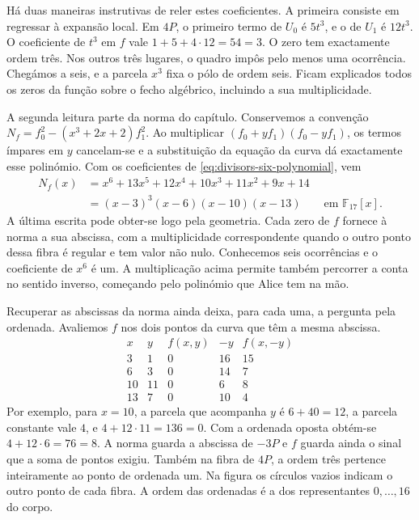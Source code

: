 Há duas maneiras instrutivas de reler estes coeficientes. A primeira
consiste em regressar à expansão local. Em \(4P\), o primeiro
termo de \(U_0\) é \(5t^3\), e o de \(U_1\) é \(12t^3\).
O coeficiente de \(t^3\) em \(f\) vale
\(1+5+4\cdot12=54=3\). O zero tem exactamente ordem três.
Nos outros três lugares, o quadro impôs pelo menos uma ocorrência.
Chegámos a seis, e a parcela \(x^3\) fixa o pólo de ordem seis.
Ficam explicados todos os zeros da função sobre o fecho algébrico,
incluindo a sua multiplicidade.

A segunda leitura parte da norma do capítulo. Conservemos a
convenção \(N_f=f_0^2-(x^3+2x+2)f_1^2\). Ao multiplicar
\((f_0+y f_1)(f_0-y f_1)\), os termos ímpares em \(y\)
cancelam-se e a substituição da equação da curva dá exactamente
esse polinómio. Com os coeficientes de \eqref{eq:divisors-six-polynomial},
vem
\begin{align*}
 N_f(x)
 &=x^6+13x^5+12x^4+10x^3+11x^2+9x+14\\
 &=(x-3)^3(x-6)(x-10)(x-13)
              \qquad\text{em }\mathbb F_{17}[x].
\end{align*}
A última escrita pode obter-se logo pela geometria. Cada zero de
\(f\) fornece à norma a sua abscissa, com a multiplicidade
correspondente quando o outro ponto dessa fibra é regular e tem
valor não nulo. Conhecemos seis ocorrências e o coeficiente de
\(x^6\) é um. A multiplicação acima permite também percorrer a
conta no sentido inverso, começando pelo polinómio que Alice tem
na mão.

Recuperar as abscissas da norma ainda deixa, para cada uma, a
pergunta pela ordenada. Avaliemos \(f\) nos dois pontos da curva
que têm a mesma abscissa.
\[
\begin{array}{c|rr|rr}
 x& y& f(x,y)&-y&f(x,-y)\\ \hline
 3&1&0&16&15\\
 6&3&0&14&7\\
 10&11&0&6&8\\
 13&7&0&10&4
\end{array}
\]
Por exemplo, para \(x=10\), a parcela que acompanha \(y\) é
\(6+40=12\), a parcela constante vale \(4\), e
\(4+12\cdot11=136=0\). Com a ordenada oposta obtém-se
\(4+12\cdot6=76=8\). A norma guarda a abscissa de \(-3P\)
e \(f\) guarda ainda o sinal que a soma de pontos exigiu.
Também na fibra de \(4P\), a ordem três pertence inteiramente ao
ponto de ordenada um. Na figura os círculos vazios indicam o outro
ponto de cada fibra. A ordem das ordenadas é a dos representantes
\(0,\ldots,16\) do corpo.

